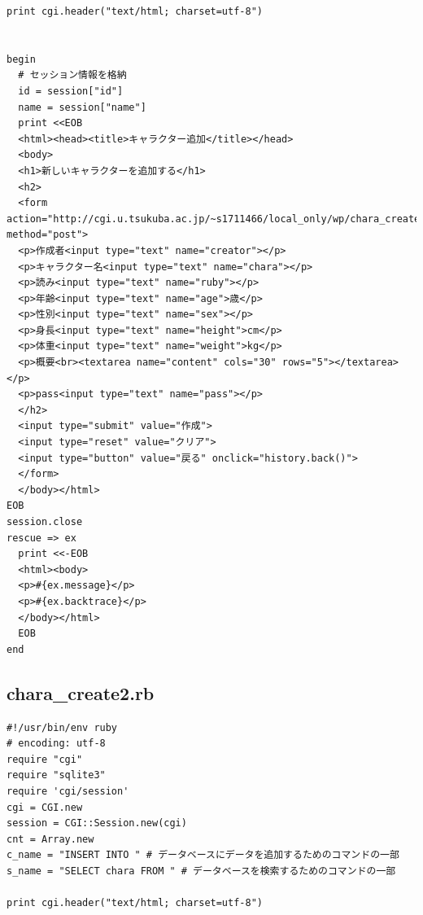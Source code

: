 \documentclass[12pt,a4paper]{jarticle}
\begin{document}
\begin{ttfamily}
\begin{oframed}
\begin{verbatim}
print cgi.header("text/html; charset=utf-8")


begin
  # セッション情報を格納
  id = session["id"]
  name = session["name"]
  print <<EOB
  <html><head><title>キャラクター追加</title></head>
  <body>
  <h1>新しいキャラクターを追加する</h1>
  <h2>
  <form action="http://cgi.u.tsukuba.ac.jp/~s1711466/local_only/wp/chara_create2.rb" method="post">
  <p>作成者<input type="text" name="creator"></p>
  <p>キャラクター名<input type="text" name="chara"></p>
  <p>読み<input type="text" name="ruby"></p>
  <p>年齢<input type="text" name="age">歳</p>
  <p>性別<input type="text" name="sex"></p>
  <p>身長<input type="text" name="height">cm</p>
  <p>体重<input type="text" name="weight">kg</p>
  <p>概要<br><textarea name="content" cols="30" rows="5"></textarea></p>
  <p>pass<input type="text" name="pass"></p>
  </h2>
  <input type="submit" value="作成">
  <input type="reset" value="クリア">
  <input type="button" value="戻る" onclick="history.back()">
  </form>
  </body></html>
EOB
session.close
rescue => ex
  print <<-EOB
  <html><body>
  <p>#{ex.message}</p>
  <p>#{ex.backtrace}</p>
  </body></html>
  EOB
end
 \end{verbatim}
\end{oframed}

\subsection*{chara\_create2.rb}
\begin{oframed}
 \fontsize{8pt}{8pt}\selectfont
 \begin{verbatim}
#!/usr/bin/env ruby
# encoding: utf-8
require "cgi"
require "sqlite3"
require 'cgi/session'
cgi = CGI.new
session = CGI::Session.new(cgi)
cnt = Array.new
c_name = "INSERT INTO " # データベースにデータを追加するためのコマンドの一部
s_name = "SELECT chara FROM " # データベースを検索するためのコマンドの一部

print cgi.header("text/html; charset=utf-8")



\end{verbatim}
\end{oframed}
\end{ttfamily}
\end{document}
